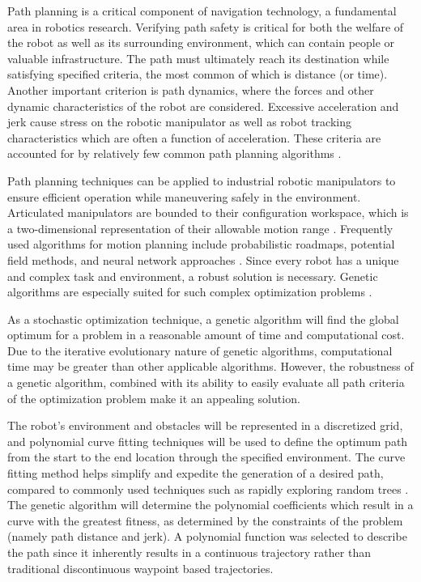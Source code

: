 
Path planning is a critical component of navigation technology, a fundamental area in robotics research. Verifying path safety is critical for both the welfare of the robot as well as its surrounding environment, which can contain people or valuable infrastructure. The path must ultimately reach its destination while satisfying specified criteria, the most common of which is distance (or time). Another important criterion is path dynamics, where the forces and other dynamic characteristics of the robot are considered. Excessive acceleration and jerk cause stress on the robotic manipulator as well as robot tracking characteristics which are often a function of acceleration. These criteria are accounted for by relatively few common path planning algorithms \cite{elshamli04}.

Path planning techniques can be applied to industrial robotic manipulators to ensure efficient operation while maneuvering safely in the environment. Articulated manipulators are bounded to their configuration workspace, which is a two-dimensional representation of their allowable motion range \cite{kavraki96}. Frequently used algorithms for motion planning include probabilistic roadmaps, potential field methods, and neural network approaches \cite{sharir89,khosla88,rimon92,yang00}. Since every robot has a unique and complex task and environment, a robust solution is necessary. Genetic algorithms are especially suited for such complex optimization problems \cite{renner03}.

As a stochastic optimization technique, a genetic algorithm will find the global optimum for a problem in a reasonable amount of time and computational cost. Due to the iterative evolutionary nature of genetic algorithms, computational time may be greater than other applicable algorithms. However, the robustness of a genetic algorithm, combined with its ability to easily evaluate all path criteria of the optimization problem make it an appealing solution.

The robot's environment and obstacles will be represented in a discretized grid, and polynomial curve fitting techniques will be used to define the optimum path from the start to the end location through the specified environment. The curve fitting method helps simplify and expedite the generation of a desired path, compared to commonly used techniques such as rapidly exploring random trees \cite{rodriguez06}. The genetic algorithm will determine the polynomial coefficients which result in a curve with the greatest fitness, as determined by the constraints of the problem (namely path distance and jerk). A polynomial function was selected to describe the path since it inherently results in a continuous trajectory rather than traditional discontinuous waypoint based trajectories. 

